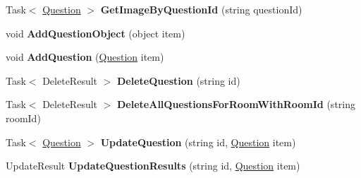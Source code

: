 \begin{DoxyCompactItemize}
\item 
\hypertarget{class_wis_r_rest_a_p_i_1_1_domain_model_1_1_question_repository_aad21539b6f89434bb4ee03298155e944}{}Task$<$ \hyperlink{class_wis_r_1_1_domain_models_1_1_question}{Question} $>$ {\bfseries Get\+Image\+By\+Question\+Id} (string question\+Id)\label{class_wis_r_rest_a_p_i_1_1_domain_model_1_1_question_repository_aad21539b6f89434bb4ee03298155e944}

\item 
\hypertarget{class_wis_r_rest_a_p_i_1_1_domain_model_1_1_question_repository_a63d5ade01709c04e31416eded4de2561}{}void {\bfseries Add\+Question\+Object} (object item)\label{class_wis_r_rest_a_p_i_1_1_domain_model_1_1_question_repository_a63d5ade01709c04e31416eded4de2561}

\item 
\hypertarget{class_wis_r_rest_a_p_i_1_1_domain_model_1_1_question_repository_a4afce847b0c584ab989ceb386f6b9f30}{}void {\bfseries Add\+Question} (\hyperlink{class_wis_r_1_1_domain_models_1_1_question}{Question} item)\label{class_wis_r_rest_a_p_i_1_1_domain_model_1_1_question_repository_a4afce847b0c584ab989ceb386f6b9f30}

\item 
\hypertarget{class_wis_r_rest_a_p_i_1_1_domain_model_1_1_question_repository_abdcbf3d44bb25a478b74edca763d1095}{}Task$<$ Delete\+Result $>$ {\bfseries Delete\+Question} (string id)\label{class_wis_r_rest_a_p_i_1_1_domain_model_1_1_question_repository_abdcbf3d44bb25a478b74edca763d1095}

\item 
\hypertarget{class_wis_r_rest_a_p_i_1_1_domain_model_1_1_question_repository_ae85912b0a31a7dca9644223dfb2900be}{}Task$<$ Delete\+Result $>$ {\bfseries Delete\+All\+Questions\+For\+Room\+With\+Room\+Id} (string room\+Id)\label{class_wis_r_rest_a_p_i_1_1_domain_model_1_1_question_repository_ae85912b0a31a7dca9644223dfb2900be}

\item 
\hypertarget{class_wis_r_rest_a_p_i_1_1_domain_model_1_1_question_repository_ab1ad3e20089154050621b6a423377451}{}Task$<$ \hyperlink{class_wis_r_1_1_domain_models_1_1_question}{Question} $>$ {\bfseries Update\+Question} (string id, \hyperlink{class_wis_r_1_1_domain_models_1_1_question}{Question} item)\label{class_wis_r_rest_a_p_i_1_1_domain_model_1_1_question_repository_ab1ad3e20089154050621b6a423377451}

\item 
\hypertarget{class_wis_r_rest_a_p_i_1_1_domain_model_1_1_question_repository_aabb402c3aab7199adcc8951e548fd32e}{}Update\+Result {\bfseries Update\+Question\+Results} (string id, \hyperlink{class_wis_r_1_1_domain_models_1_1_question}{Question} item)\label{class_wis_r_rest_a_p_i_1_1_domain_model_1_1_question_repository_aabb402c3aab7199adcc8951e548fd32e}


\end{DoxyCompactItemize}
